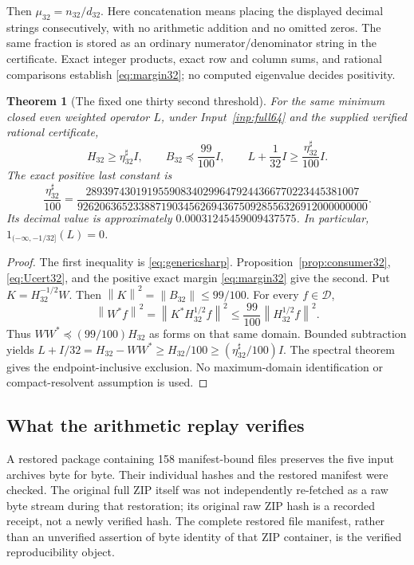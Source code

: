 \documentclass[11pt,a4paper]{article}
\numberwithin{equation}{section}
\newtheorem{theorem}{Theorem}[section]
\theoremstyle{definition}\newtheorem{definition}[theorem]{Definition}
\theoremstyle{remark}\newtheorem{remark}[theorem]{Remark}
\newcommand{\DD}{\mathcal D}
\newcommand{\norm}[1]{\left\|#1\right\|}
\begin{document}
Then $\mu_{32}=n_{32}/d_{32}$. Here concatenation means placing the displayed decimal strings consecutively, with no arithmetic addition and no omitted zeros. The same fraction is stored as an ordinary numerator/denominator string in the certificate. Exact integer products, exact row and column sums, and rational comparisons establish \eqref{eq:margin32}; no computed eigenvalue decides positivity.

\begin{theorem}[The fixed one thirty second threshold]\label{thm:main32}
For the same minimum closed even weighted operator $L$, under Input~\ref{inp:full64} and the supplied verified rational certificate,
\begin{equation}\label{eq:main32}
 H_{32}\ge\eta_{32}^{\sharp}I,\qquad
 B_{32}\preceq\frac{99}{100}I,\qquad
 L+\frac1{32}I\ge\frac{\eta_{32}^{\sharp}}{100}I.
\end{equation}
The exact positive last constant is
\begin{equation}\label{eq:lower32}
 \frac{\eta_{32}^{\sharp}}{100}=
 \frac{2893974301919559083402996479244366770223445381007}
 {9262063652338871903456269436750928556326912000000000}.
\end{equation}
Its decimal value is approximately $0.00031245459009437575$.
In particular, $1_{(-\infty,-1/32]}(L)=0$.
\end{theorem}
\begin{proof}
The first inequality is \eqref{eq:genericsharp}. Proposition~\ref{prop:consumer32}, \eqref{eq:Ucert32}, and the positive exact margin \eqref{eq:margin32} give the second. Put $K=H_{32}^{-1/2}W$. Then $\norm K^2=\norm{B_{32}}\le99/100$. For every $f\in\DD$,
\[
 \norm{W^*f}^2=\norm{K^*H_{32}^{1/2}f}^2
 \le\frac{99}{100}\norm{H_{32}^{1/2}f}^2.
\]
Thus $WW^*\preceq(99/100)H_{32}$ as forms on that same domain. Bounded subtraction yields
$L+I/32=H_{32}-WW^*\ge H_{32}/100\ge(\eta_{32}^{\sharp}/100)I$.
The spectral theorem gives the endpoint-inclusive exclusion. No maximum-domain identification or compact-resolvent assumption is used.
\end{proof}

\subsection{What the arithmetic replay verifies}
A restored package containing 158 manifest-bound files preserves the five input archives byte for byte. Their individual hashes and the restored manifest were checked. The original full ZIP itself was not independently re-fetched as a raw byte stream during that restoration; its original raw ZIP hash is a recorded receipt, not a newly verified hash. The complete restored file manifest, rather than an unverified assertion of byte identity of that ZIP container, is the verified reproducibility object.
\end{document}

